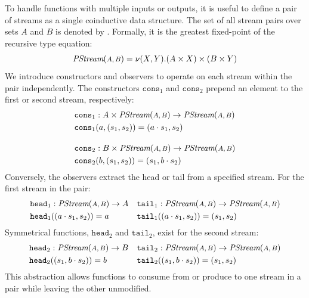 To handle functions with multiple inputs or outputs, it is useful to define a pair of streams as a
single coinductive data structure. The set of all stream pairs over sets $A$ and $B$ is denoted by
. Formally, it is the greatest fixed-point of the recursive type equation:
%
\begin{equation}
    \textit{PStream}(\mbox{\footnotesize\ensuremath{A, B}}) = \nu (X,Y). (A \times X) \times (B \times Y)
\end{equation}
%
We introduce constructors and observers to operate on each stream within the pair independently. The
constructors $\texttt{cons}_1$ and $\texttt{cons}_2$ prepend an element to the first or second
stream, respectively:
%
\begin{align}
    \texttt{cons}_1 & : A \times \textit{PStream}(\mbox{\footnotesize\ensuremath{A, B}}) \to \textit{PStream}(\mbox{\footnotesize\ensuremath{A, B}}) \\
    \texttt{cons}_1 & (a, (s_1, s_2)) = (a \cdot s_1, s_2)         \\[1em]
    \texttt{cons}_2 & : B \times \textit{PStream}(\mbox{\footnotesize\ensuremath{A, B}}) \to \textit{PStream}(\mbox{\footnotesize\ensuremath{A, B}}) \\
    \texttt{cons}_2 & (b, (s_1, s_2)) = (s_1, b \cdot s_2)
\end{align}
%
Conversely, the observers extract the head or tail from a specified stream. For the first stream in
the pair:
%
\begin{align}
    \texttt{head}_1 & : \textit{PStream}(\mbox{\footnotesize\ensuremath{A, B}}) \to A   & \texttt{tail}_1 & : \textit{PStream}(\mbox{\footnotesize\ensuremath{A, B}}) \to \textit{PStream}(\mbox{\footnotesize\ensuremath{A, B}}) \\
    \texttt{head}_1 & ((a \cdot s_1, s_2)) = a & \texttt{tail}_1 & ((a \cdot s_1, s_2)) = (s_1, s_2)
\end{align}
%
Symmetrical functions, $\texttt{head}_2$ and $\texttt{tail}_2$, exist for the second stream:
%
\begin{align}
    \texttt{head}_2 & : \textit{PStream}(\mbox{\footnotesize\ensuremath{A, B}}) \to B   & \texttt{tail}_2 & : \textit{PStream}(\mbox{\footnotesize\ensuremath{A, B}}) \to \textit{PStream}(\mbox{\footnotesize\ensuremath{A, B}}) \\
    \texttt{head}_2 & ((s_1, b \cdot s_2)) = b & \texttt{tail}_2 & ((s_1, b \cdot s_2)) = (s_1, s_2)
\end{align}
%
This abstraction allows functions to consume from or produce to one stream in a pair while leaving
the other unmodified.

